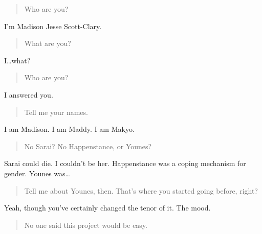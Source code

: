\begin{quote}
Who are you?
\end{quote}

I'm Madison Jesse Scott-Clary.

\begin{quote}
What are you?
\end{quote}

I\ldots{}what?

\begin{quote}
Who are you?
\end{quote}

I answered you.

\begin{quote}
Tell me your names.
\end{quote}

I am Madison. I am Maddy. I am Makyo.

\begin{quote}
No Sarai? No Happenstance, or Younes?
\end{quote}

Sarai could die. I couldn't be her. Happenstance was a coping mechanism for gender. Younes was\ldots{}

\begin{quote}
Tell me about Younes, then. That's where you started going before, right?
\end{quote}

Yeah, though you've certainly changed the tenor of it. The mood.

\begin{quote}
No one said this project would be easy.
\end{quote}

